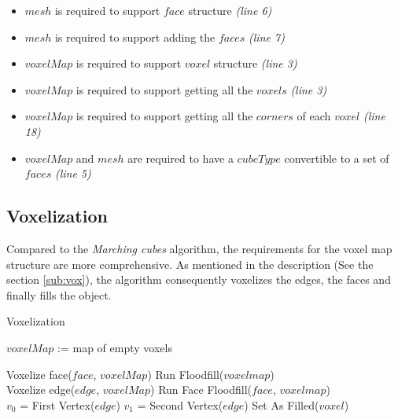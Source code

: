 \begin{itemize}
\item $mesh$ is required to support $face$ structure \emph{(line 6)}
\item $mesh$ is required to support adding the $faces$ \emph{(line 7)}
\item $voxelMap$ is required to support $voxel$ structure \emph{(line 3)}
\item $voxelMap$ is required to support getting all the $voxels$ \emph{(line 3)}
\item $voxelMap$ is required to support getting all the $corners$ of each $voxel$ \emph{(line 18)}
\item $voxelMap$ and $mesh$ are required to have a $cubeType$ convertible to a set of $faces$ \emph{(line 5)}
\end{itemize}

\subsection{Voxelization}

Compared to the \emph{Marching cubes} algorithm, the requirements for the voxel map structure
are more comprehensive. As mentioned in the description (See the section \ref{sub:vox}),
the algorithm consequently voxelizes
the edges, the faces and finally fills the object.

\begin{algorithm}[H]
\caption{Voxelization}
\label{alg:vox}
\begin{algorithmic}[1]
			\State $voxelMap$ := map of empty voxels

			\State Voxelize face($face$, $voxelMap$)
		\EndParallelFor
		\State Run Floodfill($voxel map$)
		\State {}
	\EndFunction
	\\
			\State Voxelize edge($edge$, $voxelMap$)
		\EndFor
		\State Run Face Floodfill($face$, $voxel map$)
	\EndFunction
	\\
		\State $v_{0}$ = First Vertex($edge$)
		\State $v_{1}$ = Second Vertex($edge$)
			\State Set As Filled($voxel$)
		\EndFor
	\EndFunction
\end{algorithmic}
\end{algorithm}